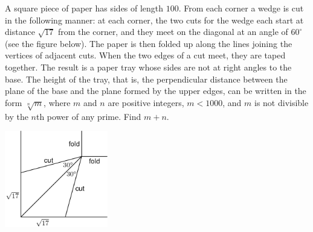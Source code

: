 A square piece of paper has sides of length $ 100$. From each corner a wedge is cut in the following manner: at each corner, the two cuts for the wedge each start at distance $ \sqrt {17}$ from the corner, and they meet on the diagonal at an angle of $ 60^\circ$ (see the figure below). The paper is then folded up along the lines joining the vertices of adjacent cuts. When the two edges of a cut meet, they are taped together. The result is a paper tray whose sides are not at right angles to the base. The height of the tray, that is, the perpendicular distance between the plane of the base and the plane formed by the upper edges, can be written in the form $ \sqrt [n]{m}$, where $ m$ and $ n$ are positive integers, $ m < 1000$, and $ m$ is not divisible by the $ n$th power of any prime. Find $ m + n$.

\begin{center}
\includegraphics[width = 45.0mm]{img/fig0.png}
\end{center}